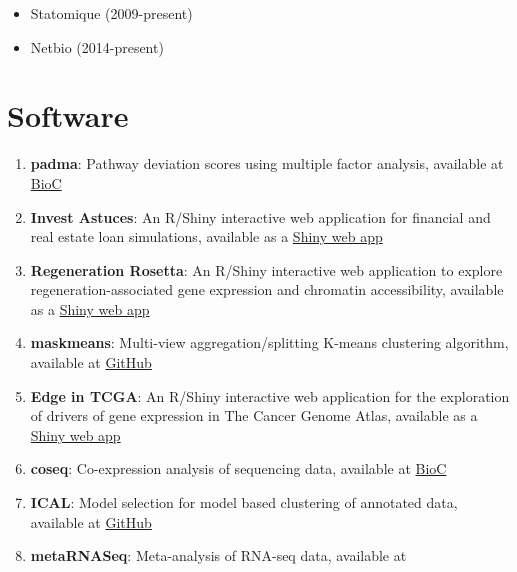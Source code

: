 \documentclass[11pt, a4paper]{awesome-cv}
\providecommand{\tightlist}{%
	\setlength{\itemsep}{0pt}\setlength{\parskip}{0pt}}
\begin{document}
\begin{itemize}
\tightlist
\item
  Statomique (2009-present)
\item
  Netbio (2014-present)
\end{itemize}

\hypertarget{software}{%
\section{Software}\label{software}}

\begin{enumerate}
\def\labelenumi{\arabic{enumi}.}
\tightlist
\item
  \textbf{padma}: Pathway deviation scores using multiple factor
  analysis, available at
  \href{https://bioconductor.org/packages/padma/}{BioC}\\
\item
  \textbf{Invest Astuces}: An R/Shiny interactive web application for
  financial and real estate loan simulations, available as a
  \href{https://investastuces.com/simulateurs/}{Shiny web app}\\
\item
  \textbf{Regeneration Rosetta}: An R/Shiny interactive web application
  to explore regeneration-associated gene expression and chromatin
  accessibility, available as a
  \href{http://ls-shiny-prod.uwm.edu/rosetta/}{Shiny web app}\\
\item
  \textbf{maskmeans}: Multi-view aggregation/splitting K-means
  clustering algorithm, available at
  \href{https://github.com/andreamrau/maskmeans}{GitHub}\\
\item
  \textbf{Edge in TCGA}: An R/Shiny interactive web application for the
  exploration of drivers of gene expression in The Cancer Genome Atlas,
  available as a \href{http://ls-shiny-prod.uwm.edu/edge_in_tcga/}{Shiny
  web app}\\
\item
  \textbf{coseq}: Co-expression analysis of sequencing data, available
  at \href{https://bioconductor.org/packages/coseq/}{BioC}\\
\item
  \textbf{ICAL}: Model selection for model based clustering of annotated
  data, available at \href{https://github.com/Gallopin/ICAL}{GitHub}\\
\item
  \textbf{metaRNASeq}: Meta-analysis of RNA-seq data, available at

\end{enumerate}
\end{document}
